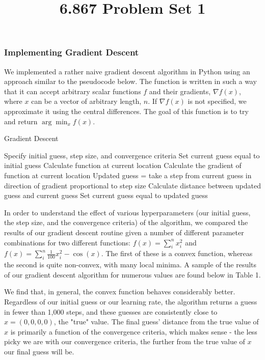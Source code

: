 \documentclass[10pt]{article}
\begin{document}
	\title{6.867 Problem Set 1}
	\maketitle
	
\subsubsection*{Implementing Gradient Descent}

We implemented a rather naive gradient descent algorithm in Python using an approach similar to the pseudocode below. The function is written in such a way that it can accept arbitrary scalar functions $f$ and their gradients, $\nabla f(x)$, where $x$ can be a vector of arbitrary length, $n$. If $\nabla f(x)$ is not specified, we approximate it using the central differences. The goal of this function is to try and return $\arg\min_x {f(x)}$.

\begin{algorithm}
\caption{Gradient Descent}
\label{GradDescent}
\begin{algorithmic}[1]
\State Specify initial guess, step size, and convergence criteria
\State Set current guess equal to initial guess
\State Calculate function at current location
\State Calculate the gradient of function at current location
\State Updated guess = take a step from current guess in direction of gradient proportional to step size
\State Calculate distance between updated guess and current guess
\State Set current guess equal to updated guess
\EndWhile{}
\EndProcedure
\end{algorithmic}
\end{algorithm}

In order to understand the effect of various hyperparameters (our initial guess, the step size, and the convergence criteria) of the algorithm, we compared the results of our gradient descent routine given a number of different parameter combinations for two different functions: $f(x) = \sum_i^n x_i^2$ and $f(x) = \sum_i^n \frac{1}{100}x_i^2 - \cos(x)$. The first of these is a convex function, whereas the second is quite non-convex, with many local minima. A sample of the results of our gradient descent algorithm for numerous values are found below in Table 1.

We find that, in general, the convex function behaves considerably better. Regardless of our initial guess or our learning rate, the algorithm returns a guess in fewer than 1,000 steps, and these guesses are consistently close to $x = (0,0,0,0)$, the "true" value. The final guess' distance from the true value of $x$ is primarily a function of the convergence criteria, which makes sense - the less picky we are with our convergence criteria, the further from the true value of $x$ our final guess will be.
\end{document}
